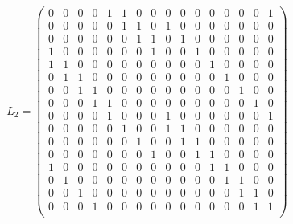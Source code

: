 \documentclass{transcrypto}
\begin{document}
\begin{appendices}
	\begin{equation*}
	L_2 = 
	\begin{pmatrix}
	0 & 0 & 0 & 0 & 1 & 1 & 0 & 0 & 0 & 0 & 0 & 0 & 0 & 0 & 0 & 1 \\ 
	0 & 0 & 0 & 0 & 0 & 1 & 1 & 0 & 1 & 0 & 0 & 0 & 0 & 0 & 0 & 0   \\ 
	0 & 0 & 0 & 0 & 0 & 0 & 1 & 1 & 0 & 1 & 0 & 0 & 0 & 0 & 0 & 0 \\ 
	1 & 0 & 0 & 0 & 0 & 0 & 0 & 1 & 0 & 0 & 1 & 0 & 0 & 0 & 0 & 0 \\ 
	1 & 1 & 0 & 0 & 0 & 0 & 0 & 0 & 0 & 0 & 0 & 1 & 0 & 0 & 0 & 0 \\ 
	0 & 1 & 1 & 0 & 0 & 0 & 0 & 0 & 0 & 0 & 0 & 0 & 1 & 0 & 0 & 0 \\ 
	0 & 0 & 1 & 1 & 0 & 0 & 0 & 0 & 0 & 0 & 0 & 0 & 0 & 1 & 0 & 0  \\ 
	0 & 0 & 0 & 1 & 1 & 0 & 0 & 0 & 0 & 0 & 0 & 0 & 0 & 0 & 1 & 0 \\ 
	0 & 0 & 0 & 0 & 1 & 0 & 0 & 0 & 1 & 0 & 0 & 0 & 0 & 0 & 0 & 1 \\ 
	0 & 0 & 0 & 0 & 0 & 1 & 0 & 0 & 1 & 1 & 0 & 0 & 0 & 0 & 0 & 0    \\ 
	0 & 0 & 0 & 0 & 0 & 0 & 1 & 0 & 0 & 1 & 1 & 0 & 0 & 0 & 0 & 0  \\ 
	0 & 0 & 0 & 0 & 0 & 0 & 0 & 1 & 0 & 0 & 1 & 1 & 0 & 0 & 0 & 0 \\ 
	1 & 0 & 0 & 0 & 0 & 0 & 0 & 0 & 0 & 0 & 0 & 1 & 1 & 0 & 0 & 0 \\ 
	0 & 1 & 0 & 0 & 0 & 0 & 0 & 0 & 0 & 0 & 0 & 0 & 1 & 1 & 0 & 0 \\ 
	0 & 0 & 1 & 0 & 0 & 0 & 0 & 0 & 0 & 0 & 0 & 0 & 0 & 1 & 1 & 0   \\ 
	0 & 0 & 0 & 1 & 0 & 0 & 0 & 0 & 0 & 0 & 0 & 0 & 0 & 0 & 1 & 1 \\ 
	\end{pmatrix}
	\end{equation*}
	

\end{appendices}
\end{document}
